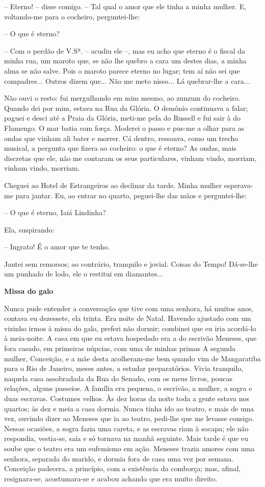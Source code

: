 -- Eterno! -- disse comigo. -- Tal qual o amor que ele tinha a minha
mulher. E, voltando-me para o cocheiro, perguntei-lhe:

-- O que é eterno?

-- Com o perdão de V.Sª. -- acudiu ele --, mas eu acho que eterno é o
fiscal da minha rua, um maroto que, se não lhe quebro a cara um destes
dias, a minha alma se não salve. Pois o maroto parece eterno no lugar;
tem aí não sei que compadres... Outros dizem que... Não me meto nisso...
Lá quebrar-lhe a cara...

Não ouvi o resto: fui mergulhando em mim mesmo, ao zunzum do cocheiro.
Quando dei por mim, estava na Rua da Glória. O demônio continuava a
falar; paguei e desci até a Praia da Glória, meti-me pela do Russell e
fui sair à do Flamengo. O mar batia com força. Moderei o passo e pus-me
a olhar para as ondas que vinham ali bater e morrer. Cá dentro,
ressoava, como um trecho musical, a pergunta que fizera ao cocheiro: o
que é eterno? As ondas, mais discretas que ele, não me contaram os seus
particulares, vinham vindo, morriam, vinham vindo, morriam.

Cheguei ao Hotel de Estrangeiros ao declinar da tarde. Minha mulher
esperava-me para jantar. Eu, ao entrar no quarto, peguei-lhe das mãos e
perguntei-lhe:

-- O que é eterno, Iaiá Lindinha?

Ela, suspirando:

-- Ingrato! É o amor que te tenho.

Jantei sem remorsos; ao contrário, tranquilo e jovial. Coisas do Tempo!
Dá-se-lhe um punhado de lodo, ele o restitui em diamantes...

\textbf{Missa do galo}

Nunca pude entender a conversação que tive com uma senhora, há muitos
anos, contava eu dezessete, ela trinta. Era noite de Natal. Havendo
ajustado com um vizinho irmos à missa do galo, preferi não dormir;
combinei que eu iria acordá-lo à meia-noite. A casa em que eu estava
hospedado era a do escrivão Meneses, que fora casado, em primeiras
núpcias, com uma de minhas primas A segunda mulher, Conceição, e a mãe
desta acolheram-me bem quando vim de Mangaratiba para o Rio de Janeiro,
meses antes, a estudar preparatórios. Vivia tranquilo, naquela casa
assobradada da Rua do Senado, com os meus livros, poucas relações,
alguns passeios. A família era pequena, o escrivão, a mulher, a sogra e
duas escravas. Costumes velhos. Às dez horas da noite toda a gente
estava nos quartos; às dez e meia a casa dormia. Nunca tinha ido ao
teatro, e mais de uma vez, ouvindo dizer ao Meneses que ia ao teatro,
pedi-lhe que me levasse consigo. Nessas ocasiões, a sogra fazia uma
careta, e as escravas riam à socapa; ele não respondia, vestia-se, saía
e só tornava na manhã seguinte. Mais tarde é que eu soube que o teatro
era um eufemismo em ação. Meneses trazia amores com uma senhora,
separada do marido, e dormia fora de casa uma vez por semana. Conceição
padecera, a princípio, com a existência da comborça; mas, afinal,
resignara-se, acostumara-se e acabou achando que era muito direito.

